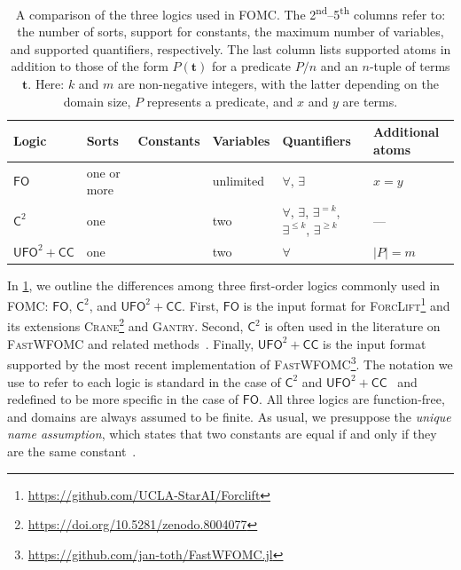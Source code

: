 \documentclass[a4paper,UKenglish,cleveref, autoref, thm-restate]{lipics-v2021}
\newcommand{\cmark}{\ding{51}}
\newcommand{\xmark}{\ding{55}}
\newcommand{\Ctwo}{$\mathsf{C}^{2}$}
\newcommand{\FO}{$\mathsf{FO}$}
\newcommand{\UFO}{$\mathsf{UFO}^{2} + \mathsf{CC}$}
\newcommand{\Cranetwo}{\textsc{Gantry}}
\begin{document}
\begin{table}[t]
  \centering
  \begin{tabular}{llclll}
    \toprule
    Logic & Sorts & Constants & Variables & Quantifiers & Additional atoms\\
    \midrule
    \FO & one or more & \cmark & unlimited & $\forall$, $\exists$ & $x = y$\\
    \Ctwo & one & \xmark & two & $\forall$, $\exists$, $\exists^{= k}$, $\exists^{\le k}$, $\exists^{\ge k}$ & ---\\
    \UFO & one & \xmark & two & $\forall$ & $|P| = m$\\
    \bottomrule
  \end{tabular}
  \caption{A comparison of the three logics used in FOMC\@. The
    2\textsuperscript{nd}--5\textsuperscript{th} columns refer to: the number of
    sorts, support for constants, the maximum number of variables, and supported
    quantifiers, respectively. The last column lists supported atoms in addition
    to those of the form $P(\mathbf{t})$ for a predicate $P/n$ and an $n$-tuple
    of terms $\mathbf{t}$. Here: $k$ and $m$ are non-negative integers, with the
    latter depending on the domain size, $P$ represents a predicate, and $x$ and
    $y$ are terms. }\label{tbl:logics}
\end{table}

\renewcommand*{\thefootnote}{\fnsymbol{footnote}}

In \cref{tbl:logics}, we outline the differences among three first-order logics
commonly used in FOMC: \FO{}, \Ctwo{}, and \UFO{}. First, \FO{} is the input
format for
\textsc{ForcLift}\footnote{\url{https://github.com/UCLA-StarAI/Forclift}} and
its extensions
\textsc{Crane}\footnote{\url{https://doi.org/10.5281/zenodo.8004077}} and
\Cranetwo{}. Second, \Ctwo{} is often used in the literature on
\textsc{FastWFOMC} and related
methods~\cite{DBLP:journals/jair/Kuzelka21,DBLP:conf/aaai/MalhotraS22}. Finally,
\UFO{} is the input format supported by the most recent implementation of
\textsc{FastWFOMC}\footnote{\url{https://github.com/jan-toth/FastWFOMC.jl}}. The
notation we use to refer to each logic is standard in the case of \Ctwo{} and
\UFO{}~\cite{tóth2024complexityweightedfirstordermodel} and redefined to be more
specific in the case of \FO{}. All three logics are function-free, and domains
are always assumed to be finite. As usual, we presuppose the \emph{unique name
  assumption}, which states that two constants are equal if and only if they are
the same constant~\cite{DBLP:books/aw/RN2020}.
\end{document}
